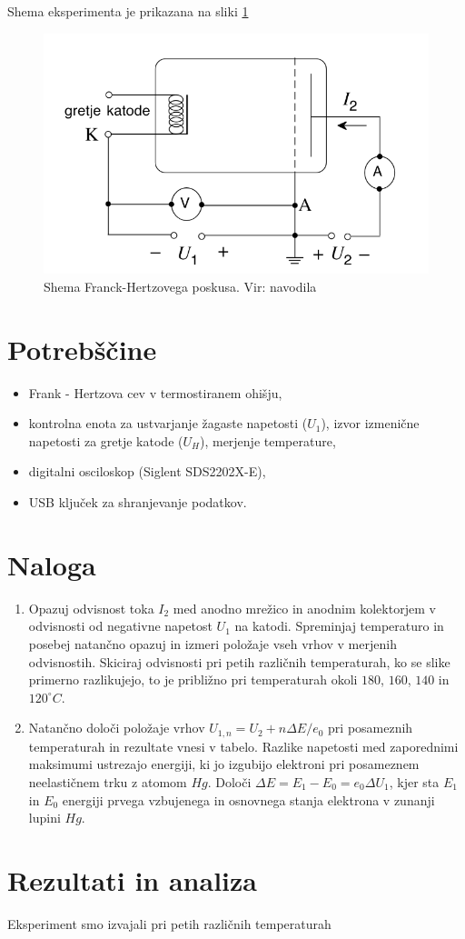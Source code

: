 \documentclass[10pt]{article}
\begin{document}
Shema eksperimenta je prikazana na sliki \ref{shema}

\begin{figure}[h]
\begin{center}
    \includegraphics[width=10 cm]{shema.png}
    \caption{Shema Franck-Hertzovega poskusa. Vir: navodila}
    \label{shema}
\end{center}
\end{figure}

\section{Potrebščine}

\begin{itemize}
    \item Frank - Hertzova cev v termostiranem ohišju,
    \item kontrolna enota za ustvarjanje žagaste napetosti ($U_1$), izvor izmenične napetosti za gretje katode ($U_H$), merjenje temperature,
    \item digitalni osciloskop (Siglent SDS2202X-E),
    \item USB ključek za shranjevanje podatkov.
\end{itemize}

\section{Naloga}

\begin{enumerate}
    \item Opazuj odvisnost toka $I_2$ med anodno mrežico in anodnim kolektorjem v odvisnosti od negativne napetost $U_1$ na katodi. Spreminjaj temperaturo in posebej natančno opazuj in izmeri položaje vseh vrhov v merjenih odvisnostih. Skiciraj odvisnosti pri petih različnih temperaturah, ko se slike primerno razlikujejo, to je približno pri temperaturah okoli $180$, $160$, $140$ in $120^{\circ}C$.
    \item Natančno določi položaje vrhov $U_{1,n} = U_2 + n\Delta E/e_0$ pri posameznih temperaturah in rezultate vnesi v tabelo. Razlike napetosti med zaporednimi maksimumi ustrezajo energiji, ki jo izgubijo elektroni pri posameznem neelastičnem trku z atomom $Hg$. Določi $\Delta E = E_1 - E_0 = e_0 \Delta U_1$, kjer sta $E_1$ in $E_0$ energiji prvega vzbujenega in osnovnega stanja elektrona v zunanji lupini $Hg$.
\end{enumerate}

\section{Rezultati in analiza}

Eksperiment smo izvajali pri petih različnih temperaturah
\end{document}
